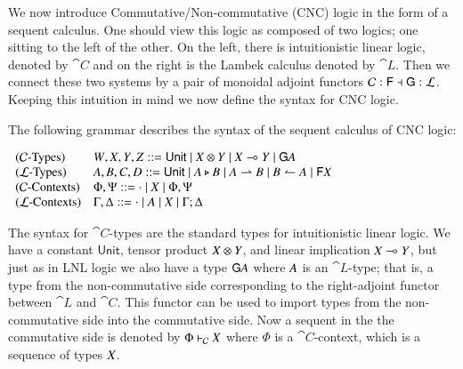 We now introduce Commutative/Non-commutative (CNC) logic in the form of a
sequent calculus. One should view this logic as composed of two logics; one
sitting to the left of the other. On the left, there is intuitionistic
linear logic, denoted by $\cat{C}$ and on the right is the Lambek calculus
denoted by $\cat{L}$. Then we connect these two systems by a pair of
monoidal adjoint functors $\mathcal{C} : \mathsf{F} \dashv \mathsf{G} : \mathcal{L}$.
Keeping this intuition in mind we now define the syntax for CNC logic.

\begin{definition}
  \label{def:Lambek-syntax}
  The following grammar describes the syntax of the sequent calculus of
  CNC logic:
  \begin{center}\vspace{-3px}\small
    \begin{math}
      \begin{array}{lll}
        \text{($\mathcal{C}$-Types)} & \mathit{W},\mathit{X},\mathit{Y},\mathit{Z} ::=  \mathsf{Unit}  \mid \mathit{X}  \otimes  \mathit{Y} \mid \mathit{X}  \multimap  \mathit{Y} \mid  \mathsf{G} \mathit{A} \\
        \text{($\mathcal{L}$-Types)} & \mathit{A},\mathit{B},\mathit{C},D ::=  \mathsf{Unit}  \mid \mathit{A}  \triangleright  \mathit{B} \mid \mathit{A}  \rightharpoonup  \mathit{B} \mid \mathit{B}  \leftharpoonup  \mathit{A} \mid  \mathsf{F} \mathit{X} \\
        \text{($\mathcal{C}$-Contexts)} & \Phi,\Psi ::=  \cdot  \mid \mathit{X} \mid \Phi  ,  \Psi\\
        \text{($\mathcal{L}$-Contexts)} & \Gamma,\Delta ::=  \cdot  \mid \mathit{A} \mid \mathit{X} \mid \Gamma  ;  \Delta\\
      \end{array}
    \end{math}
  \end{center}
\end{definition}

The syntax for $\cat{C}$-types are the standard types for intuitionistic
linear logic. We have a constant $ \mathsf{Unit} $, tensor product $\mathit{X}  \otimes  \mathit{Y}$,
and linear implication $\mathit{X}  \multimap  \mathit{Y}$, but just as in LNL logic we also have a
type $ \mathsf{G} \mathit{A} $ where $\mathit{A}$ is an $\cat{L}$-type; that is, a type from the
non-commutative side corresponding to the right-adjoint functor between
$\cat{L}$ and $\cat{C}$. This functor can be used to import types from the
non-commutative side into the commutative side. Now a sequent in the the
commutative side is denoted by $\Phi  \vdash_\mathcal{C}  \mathit{X}$ where $\Phi$ is a
$\cat{C}$-context, which is a sequence of types $\mathit{X}$.

